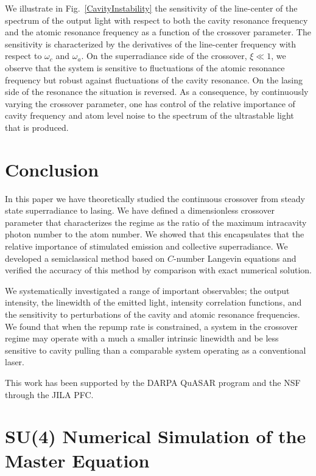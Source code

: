 \documentclass[aps,
twocolumn,
showpacs,
superscriptaddress,groupedaddress]{revtex4}
\begin{document}
We illustrate in Fig.~\ref{CavityInstability} the sensitivity of the
line-center of the spectrum of the output light with respect to both
the cavity resonance frequency and the atomic resonance frequency as a
function of the crossover parameter. The sensitivity is characterized
by the derivatives of the line-center frequency with respect to
$\omega_c$ and $\omega_a$.  On the superradiance side of the
crossover, $\xi \ll 1$, we observe that the system is sensitive to
fluctuations of the atomic resonance frequency but robust against
fluctuations of the cavity resonance.  On the lasing side of the
resonance the situation is reversed. As a consequence, by continuously
varying the crossover parameter, one has control of the relative
importance of cavity frequency and atom level noise to the spectrum of
the ultrastable light that is produced.


\section{Conclusion}

In this paper we have theoretically studied the continuous crossover
from steady state superradiance to lasing.  We have defined a
dimensionless crossover parameter that characterizes the regime as the
ratio of the maximum intracavity photon number to the atom number. We
showed that this encapsulates that the relative importance of
stimulated emission and collective superradiance. We developed a
semiclassical method based on $C$-number Langevin equations and
verified the accuracy of this method by comparison with exact
numerical solution.

We systematically investigated a range of important observables; the
output intensity, the linewidth of the emitted light, intensity
correlation functions, and the sensitivity to perturbations of the
cavity and atomic resonance frequencies.  We found that when the
repump rate is constrained, a system in the crossover regime may
operate with a much a smaller intrinsic linewidth and be less
sensitive to cavity pulling than a comparable system operating as a
conventional laser.

\begin{acknowledgments}
  This work has been supported by the DARPA QuASAR program and the NSF
  through the JILA PFC.
\end{acknowledgments}


\appendix

\section{SU(4) Numerical Simulation of the Master Equation}
\label{Su4Appendix}
\end{document}
